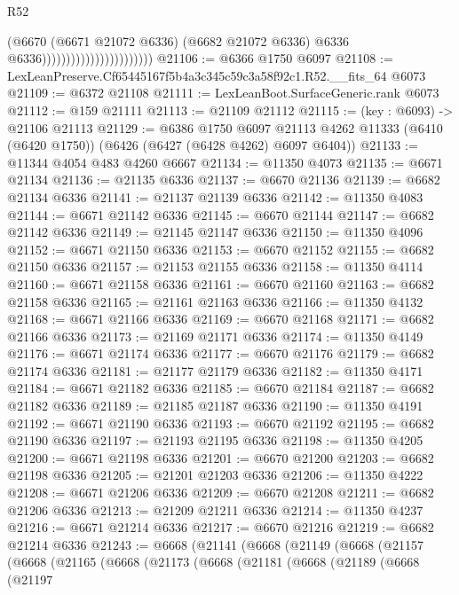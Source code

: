 \begin{lexlean}{R52}
\begin{coremodule}
                                                (@6670
                                                  (@6671 @21072 @6336)
                                                  (@6682 @21072 @6336)
                                                  @6336
                                                  @6336)))))))))))))))))))))))
@21106 := @6366 @1750 @6097
@21108 := LexLeanPreserve.Cf65445167f5b4a3c345c59c3a58f92c1.R52.__fits_64 @6073
@21109 := @6372 @21108
@21111 := LexLeanBoot.SurfaceGeneric.rank @6073
@21112 := @159 @21111
@21113 := @21109 @21112
@21115 := (key : @6093) -> @21106 @21113
@21129 := @6386
    @1750
    @6097
    @21113
    @4262
    @11333
    (@6410 (@6420 @1750))
    (@6426 (@6427 (@6428 @4262) @6097 @6404))
@21133 := @11344 @4054 @483 @4260 @6667
@21134 := @11350 @4073
@21135 := @6671 @21134
@21136 := @21135 @6336
@21137 := @6670 @21136
@21139 := @6682 @21134 @6336
@21141 := @21137 @21139 @6336
@21142 := @11350 @4083
@21144 := @6671 @21142 @6336
@21145 := @6670 @21144
@21147 := @6682 @21142 @6336
@21149 := @21145 @21147 @6336
@21150 := @11350 @4096
@21152 := @6671 @21150 @6336
@21153 := @6670 @21152
@21155 := @6682 @21150 @6336
@21157 := @21153 @21155 @6336
@21158 := @11350 @4114
@21160 := @6671 @21158 @6336
@21161 := @6670 @21160
@21163 := @6682 @21158 @6336
@21165 := @21161 @21163 @6336
@21166 := @11350 @4132
@21168 := @6671 @21166 @6336
@21169 := @6670 @21168
@21171 := @6682 @21166 @6336
@21173 := @21169 @21171 @6336
@21174 := @11350 @4149
@21176 := @6671 @21174 @6336
@21177 := @6670 @21176
@21179 := @6682 @21174 @6336
@21181 := @21177 @21179 @6336
@21182 := @11350 @4171
@21184 := @6671 @21182 @6336
@21185 := @6670 @21184
@21187 := @6682 @21182 @6336
@21189 := @21185 @21187 @6336
@21190 := @11350 @4191
@21192 := @6671 @21190 @6336
@21193 := @6670 @21192
@21195 := @6682 @21190 @6336
@21197 := @21193 @21195 @6336
@21198 := @11350 @4205
@21200 := @6671 @21198 @6336
@21201 := @6670 @21200
@21203 := @6682 @21198 @6336
@21205 := @21201 @21203 @6336
@21206 := @11350 @4222
@21208 := @6671 @21206 @6336
@21209 := @6670 @21208
@21211 := @6682 @21206 @6336
@21213 := @21209 @21211 @6336
@21214 := @11350 @4237
@21216 := @6671 @21214 @6336
@21217 := @6670 @21216
@21219 := @6682 @21214 @6336
@21243 := @6668
    (@21141
      (@6668
        (@21149
          (@6668
            (@21157
              (@6668
                (@21165
                  (@6668
                    (@21173
                      (@6668
                        (@21181
                          (@6668
                            (@21189
                              (@6668
                                (@21197

\end{coremodule}
\end{lexlean}
